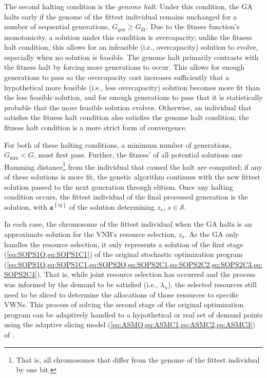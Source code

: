 \documentclass[12pt,dvipsnames]{report}
\begin{document}
The second halting condition is the \emph{genome halt}.  Under this condition, the GA halts early if the genome of the fittest individual remains unchanged for a number of sequential generations, $G_{\text{gen}} \geq G_{\text{fit}}$.  Due to the fitness function's monotonicity, a solution under this condition is overcapacity; unlike the fitness halt condition, this allows for an infeasible (i.e., overcapacity) solution to evolve, especially when no solution is feasible.  The genome halt primarily contrasts with the fitness halt by forcing more generations to occur.  This allows for enough generations to pass so the overcapacity cost increases sufficiently that a hypothetical more feasible (i.e., less overcapacity) solution becomes more fit than the less feasible solution, and for enough generations to pass that it is statistically probable that the more feasible solution evolves.  Otherwise, an individual that satisfies the fitness halt condition also satisfies the genome halt condition; the fitness halt condition is a more strict form of convergence.

For both of these halting conditions, a minimum number of generations, $G_{\min} < G$, must first pass.  Further, the fitness' of all potential solutions one Hamming distance\footnote{That is, all chromosomes that differ from the genome of the fittest individual by one bit.} from the individual that caused the halt are computed; if any of these solutions is more fit, the genetic algorithm continues with the new fittest solution passed to the next generation through elitism.  Once any halting condition occurs, the fittest individual of the final processed generation is the solution, with $\textbf{z}^{\left\{ ig \right\}}$ of the solution determining $z_s,\, s \in \mathcal{S}$.

In each case, the chromosome of the fittest individual when the GA halts is an approximate solution for the VNB's resource selection, $z_s$.  As the GA only handles the resource selection, it only represents a solution of the first stage (\cref{eq:SOPS1O,eq:SOPS1C1}) of the original stochastic optimization program (\cref{eq:SOPS1O,eq:SOPS1C1,eq:SOPS2O,eq:SOPS2C1,eq:SOPS2C2,eq:SOPS2C3,eq:SOPS2C4}).  That is, while joint resource selection has occurred and the process was informed by the demand to be satisfied (i.e., $\lambda_n$), the selected resources still need to be sliced to determine the allocations of those resources to specific VWNs.  This process of solving the second stage of the original optimization program can be adaptively handled to a hypothetical or real set of demand points using the adaptive slicing model (\cref{eq:ASMO,eq:ASMC1,eq:ASMC2,eq:ASMC3}) of .
\end{document}
